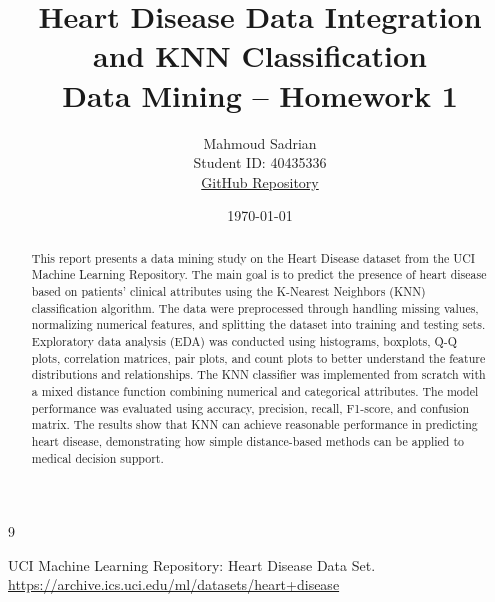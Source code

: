 \documentclass[12pt,a4paper]{article}
\title{Heart Disease Data Integration and KNN Classification\\
	\large Data Mining -- Homework 1}
\author{
	Mahmoud Sadrian \\ Student ID: 40435336 \\
	\href{https://github.com/mahmoud-sadrian/heart-disease_KNN_classifier/}{GitHub Repository}
}
\date{\today}
\begin{document}
	
	\maketitle
	
	\begin{abstract}
		This report presents a data mining study on the Heart Disease dataset from the UCI Machine Learning Repository.
		The main goal is to predict the presence of heart disease based on patients' clinical attributes using the 
		K-Nearest Neighbors (KNN) classification algorithm. The data were preprocessed through handling missing values,
		normalizing numerical features, and splitting the dataset into training and testing sets. 
		Exploratory data analysis (EDA) was conducted using histograms, boxplots, Q-Q plots, correlation matrices,
		pair plots, and count plots to better understand the feature distributions and relationships.
		The KNN classifier was implemented from scratch with a mixed distance function combining numerical
		and categorical attributes. The model performance was evaluated using accuracy, precision, recall, F1-score,
		and confusion matrix. The results show that KNN can achieve reasonable performance in predicting heart disease,
		demonstrating how simple distance-based methods can be applied to medical decision support.
	\end{abstract}
	
	
	
	
	
	
	
	
	\begin{thebibliography}{9}
		
		UCI Machine Learning Repository: Heart Disease Data Set.\\
		\url{https://archive.ics.uci.edu/ml/datasets/heart+disease}
		
	\end{thebibliography}
	
\end{document}
